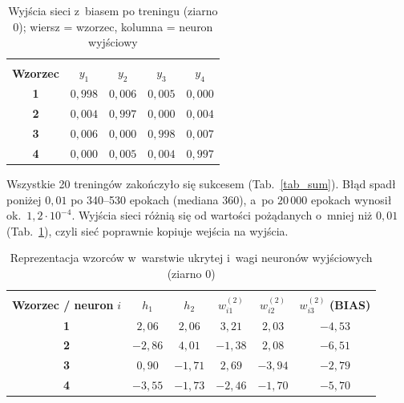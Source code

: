 \documentclass[12pt]{article}
\begin{document}
\begin{table}[h!]
 \caption{Wyjścia sieci z~biasem po treningu (ziarno 0); wiersz = wzorzec, kolumna = neuron wyjściowy}
 \centering
 \vspace{0.2cm}
 \begin{tabular}{c c c c c}
  \hline\hline\\[-0.4cm]
  \textbf{Wzorzec} & $y_1$ & $y_2$ & $y_3$ & $y_4$\\[0.1cm]
  \hline
  \textbf{1} & $0{,}998$ & $0{,}006$ & $0{,}005$ & $0{,}000$ \\
  \textbf{2} & $0{,}004$ & $0{,}997$ & $0{,}000$ & $0{,}004$ \\
  \textbf{3} & $0{,}006$ & $0{,}000$ & $0{,}998$ & $0{,}007$ \\
  \textbf{4} & $0{,}000$ & $0{,}005$ & $0{,}004$ & $0{,}997$ \\
  \hline
 \end{tabular}
 \label{tab_ybias}
\end{table}

\noindent Wszystkie 20 treningów zakończyło się sukcesem (Tab.~\ref{tab_sum}). Błąd spadł poniżej
$0{,}01$ po 340--530 epokach (mediana 360), a~po $20\,000$ epokach wynosił ok.~$1{,}2\cdot10^{-4}$.
Wyjścia sieci różnią się od wartości pożądanych o~mniej niż $0{,}01$ (Tab.~\ref{tab_ybias}),
czyli sieć poprawnie kopiuje wejścia na wyjścia.

\begin{table}[h!]
 \caption{Reprezentacja wzorców w~warstwie ukrytej i~wagi neuronów wyjściowych (ziarno 0)}
 \centering
 \vspace{0.2cm}
 \begin{tabular}{c c c c c c}
  \hline\hline\\[-0.4cm]
  \textbf{Wzorzec / neuron} $i$ & $h_1$ & $h_2$ & $w_{i1}^{(2)}$ & $w_{i2}^{(2)}$ & $w_{i3}^{(2)}$ \textbf{(BIAS)}\\[0.1cm]
  \hline
  \textbf{1} & $2{,}06$ & $2{,}06$ & $3{,}21$ & $2{,}03$ & $-4{,}53$ \\
  \textbf{2} & $-2{,}86$ & $4{,}01$ & $-1{,}38$ & $2{,}08$ & $-6{,}51$ \\
  \textbf{3} & $0{,}90$ & $-1{,}71$ & $2{,}69$ & $-3{,}94$ & $-2{,}79$ \\
  \textbf{4} & $-3{,}55$ & $-1{,}73$ & $-2{,}46$ & $-1{,}70$ & $-5{,}70$ \\
  \hline
 \end{tabular}
 \label{tab_wbias}
\end{table}
\end{document}
